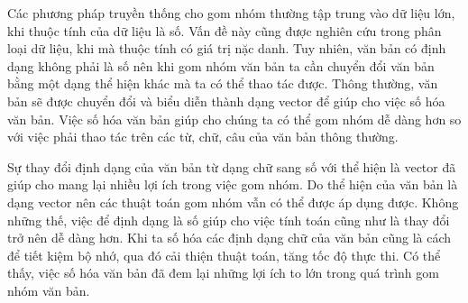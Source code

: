 Các phương pháp truyền thống cho gom nhóm thường tập trung vào dữ liệu lớn, khi thuộc tính của dữ liệu là số.
Vấn đề này cũng được nghiên cứu trong phân loại dữ liệu, khi mà thuộc tính có giá trị nặc danh.
Tuy nhiên, văn bản có định dạng không phải là số nên khi gom nhóm văn bản ta cần chuyển đổi văn bản bằng một dạng thể hiện khác mà ta có thể thao tác được.
Thông thường, văn bản sẽ được chuyển đổi và biểu diễn thành dạng vector để giúp cho việc số hóa văn bản.
Việc số hóa văn bản giúp cho chúng ta có thể gom nhóm dễ dàng hơn so với việc phải thao tác trên các từ, chữ, câu của văn bản thông thường.

Sự thay đổi định dạng của văn bản từ dạng chữ sang số với thể hiện là vector đã giúp cho mang lại nhiều lợi ích trong việc gom nhóm.
Do thể hiện của văn bản là dạng vector nên các thuật toán gom nhóm vẫn có thể được áp dụng được.
Không những thế, việc để định dạng là số giúp cho việc tính toán cũng như là thay đổi trở nên dễ dàng hơn.
Khi ta số hóa các định dạng chữ của văn bản cũng là cách để tiết kiệm bộ nhớ, qua đó cải thiện thuật toán, tăng tốc độ thực thi.
Có thể thấy, việc số hóa văn bản đã đem lại những lợi ích to lớn trong quá trình gom nhóm văn bản.



